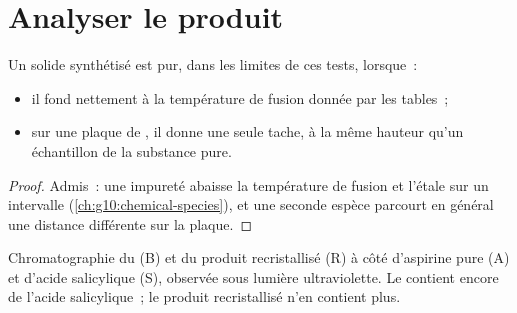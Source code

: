 \section{Analyser le produit}

\begin{proposition}\label{prop:g10:synthesis-yield:checks}
Un solide synthétisé est pur, dans les limites de ces tests, lorsque~:
\begin{itemize}
  \item il fond nettement à la température de fusion donnée par les
        tables~;
  \item sur une plaque de , il donne une
        seule tache, à la même hauteur qu'un échantillon de la substance
        pure.
\end{itemize}
\end{proposition}

\begin{proof}
Admis~: une impureté abaisse la température de fusion et l'étale sur un
intervalle (\cref{ch:g10:chemical-species}), et une seconde espèce
parcourt en général une distance différente sur la plaque.
\end{proof}

\begin{omfigure}

{\small Chromatographie du  (B) et du produit recristallisé
(R) à côté d'aspirine pure (A) et d'acide salicylique (S), observée sous
lumière ultraviolette. Le  contient encore de l'acide
salicylique~; le produit recristallisé n'en contient plus.}
\end{omfigure}

